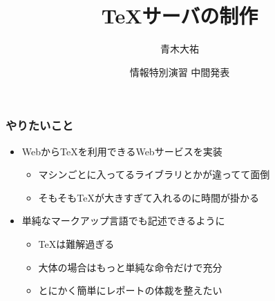 \documentclass[14pt,dvipdfm,trans]{beamer}
\title{TeXサーバの制作}
\author{青木大祐}
\institute{情報科学類}
\date{情報特別演習 中間発表}
\begin{document}
\frame{\titlepage}

\begin{frame}
 \frametitle{やりたいこと}
 \begin{itemize}
  \item WebからTeXを利用できるWebサービスを実装
        \begin{itemize}
         \item マシンごとに入ってるライブラリとかが違ってて面倒
         \item そもそもTeXが大きすぎて入れるのに時間が掛かる
        \end{itemize}
        \vspace*{1zh}
  \item 単純なマークアップ言語でも記述できるように
        \begin{itemize}
         \item TeXは難解過ぎる
         \item 大体の場合はもっと単純な命令だけで充分
         \item とにかく簡単にレポートの体裁を整えたい
        \end{itemize}
 \end{itemize}
\end{frame}
\end{document}
